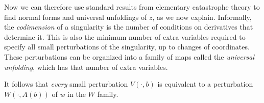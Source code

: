 \documentclass[a4paper,fleqn]{cas-dc}
\newcommand{\R}{\mathbb{R}}
\newcommand{\II}{{\mathcal I}}
\newcommand{\END}{\hfill\mbox{\raggedright \mbox{\raisebox{2pt}{\scalebox{0.6}{$\Diamond$}}}}\medskip}
\begin{document}
Now we can therefore use standard results from elementary catastrophe theory to find normal forms and universal unfoldings of $z$, as we now explain.
Informally, the {\em codimension} of a singularity is the number of conditions on derivatives that determine it. 
This is also the minimum number of extra variables required to specify all small perturbations of the singularity, up to changes of coordinates. 
These perturbations can be organized into a family of maps called the {\em universal unfolding}, which has that number of extra variables.


It follows that {\em every} small perturbation $V(\cdot, b)$ is equivalent to a perturbation $W(\cdot,A(b))$ of $w$ in the $W$ family.  
\end{document}
